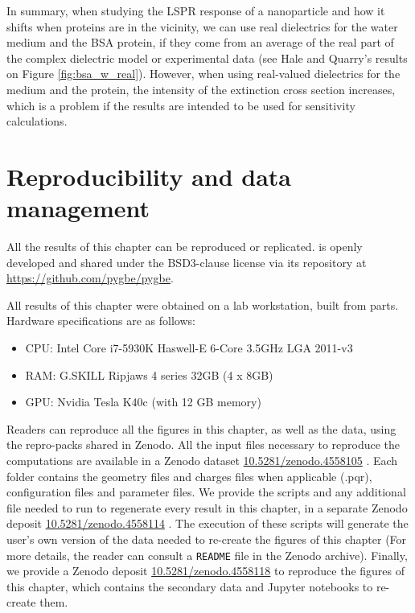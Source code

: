 In summary, when studying the LSPR response of a nanoparticle and how it shifts when proteins are in the vicinity, we can use 
real dielectrics for the water medium and the BSA protein, if they come from an average of the real part of the complex dielectric model 
or experimental data (see Hale and Quarry's results on Figure \ref{fig:bsa_w_real}). However, when using real-valued dielectrics for the medium 
and the protein, the intensity of the extinction cross section increases, which is a problem if the results are intended to be used for 
sensitivity calculations. 

\section{Reproducibility and data management} \label{sec:repro_ell}
 
All the results of this chapter can be reproduced or replicated. \pygbe is openly developed and 
shared under the BSD3-clause license via its repository at \url{https://github.com/pygbe/pygbe}.

All results of this chapter were obtained on a lab workstation, built from parts. Hardware specifications are as follows:

\begin{itemize}
  \item CPU: Intel Core i7-5930K Haswell-E 6-Core 3.5GHz LGA 2011-v3
  \item RAM: G.SKILL Ripjaws 4 series 32GB (4 x 8GB)
  \item GPU: Nvidia Tesla K40c (with 12 GB memory)
\end{itemize}

Readers can reproduce all the figures in this chapter, as well as the data, using the repro-packs shared in Zenodo. 
All the input files necessary to reproduce the computations are available in a Zenodo dataset \href{https://doi.org/10.5281/zenodo.4558105}{10.5281/zenodo.4558105} \cite{Clementi2021-Zen_IF}. 
Each folder contains the geometry files and charges files when applicable (.pqr), configuration files and parameter files.
We provide the scripts and any additional file needed to run \pygbe to regenerate every result in this chapter, in a 
separate Zenodo deposit \href{https://doi.org/10.5281/zenodo.4558114}{10.5281/zenodo.4558114} \cite{Clementi2021-Zen_EF}. The execution of these scripts will generate the user's own version of the data 
needed to re-create the figures of this chapter (For more details, the reader can consult a \texttt{README} file in the Zenodo archive).
Finally, we provide a Zenodo deposit \href{https://doi.org/10.5281/zenodo.4558118}{10.5281/zenodo.4558118} \cite{Clementi2021-Zen_RP} to reproduce the figures of this chapter, which contains the secondary data and 
Jupyter notebooks to re-create them. 
